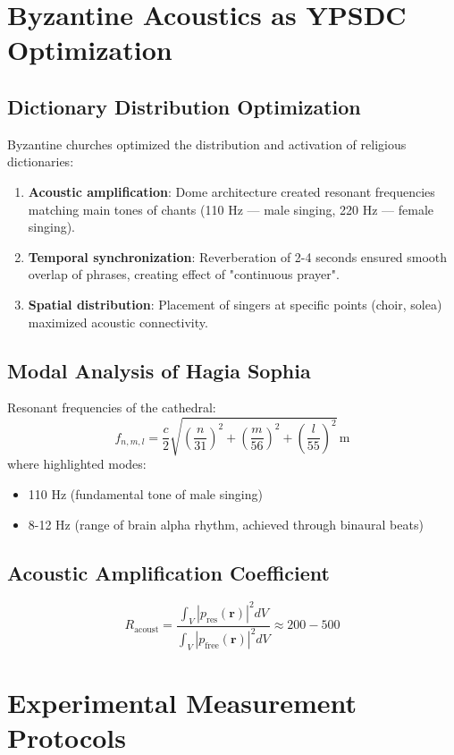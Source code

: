 \documentclass[12pt,a4paper]{article}
\begin{document}
	\section{Byzantine Acoustics as YPSDC Optimization}
	
	\subsection{Dictionary Distribution Optimization}
	
	Byzantine churches optimized the distribution and activation of religious dictionaries:
	
	\begin{enumerate}
		\item \textbf{Acoustic amplification}: Dome architecture created resonant frequencies matching main tones of chants (110 Hz — male singing, 220 Hz — female singing).
		\item \textbf{Temporal synchronization}: Reverberation of 2-4 seconds ensured smooth overlap of phrases, creating effect of "continuous prayer".
		\item \textbf{Spatial distribution}: Placement of singers at specific points (choir, solea) maximized acoustic connectivity.
	\end{enumerate}
	
	\subsection{Modal Analysis of Hagia Sophia}
	
	Resonant frequencies of the cathedral:
	\[
	f_{n,m,l} = \frac{c}{2} \sqrt{\left(\frac{n}{31}\right)^2 + \left(\frac{m}{56}\right)^2 + \left(\frac{l}{55}\right)^2} \, \mathrm{m}
	\]
	where highlighted modes:
	\begin{itemize}
		\item 110 Hz (fundamental tone of male singing)
		\item 8-12 Hz (range of brain alpha rhythm, achieved through binaural beats)
	\end{itemize}
	
	\subsection{Acoustic Amplification Coefficient}
	\[
	R_{\mathrm{acoust}} = \frac{\int_V |p_{\mathrm{res}}(\mathbf{r})|^2 dV}{\int_V |p_{\mathrm{free}}(\mathbf{r})|^2 dV} \approx 200-500
	\]
	
	\section{Experimental Measurement Protocols}
	
\end{document}

